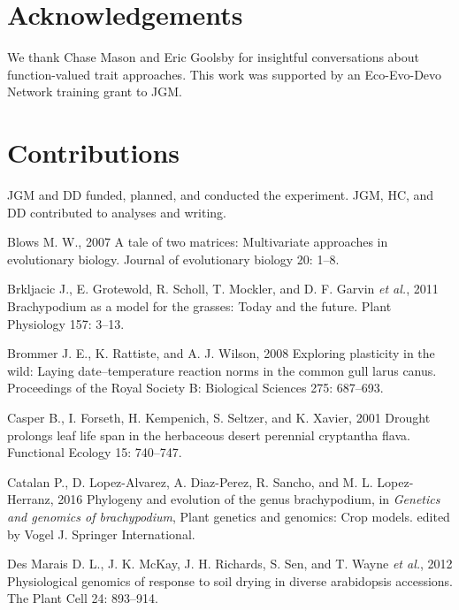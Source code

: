 \documentclass[jou,floatsintext]{apa6}
\begin{document}
\hypertarget{acknowledgements}{%
\section{Acknowledgements}\label{acknowledgements}}

We thank Chase Mason and Eric Goolsby for insightful conversations about function-valued trait approaches. This work was supported by an Eco-Evo-Devo Network training grant to JGM.

\hypertarget{contributions}{%
\section{Contributions}\label{contributions}}

JGM and DD funded, planned, and conducted the experiment. JGM, HC, and DD contributed to analyses and writing.

\newpage

\begingroup
\setlength{\parindent}{-0.5in}
\setlength{\leftskip}{0.5in}

\hypertarget{refs}{}
\leavevmode\hypertarget{ref-blows2007tale}{}%
Blows M. W., 2007 A tale of two matrices: Multivariate approaches in evolutionary biology. Journal of evolutionary biology 20: 1--8.

\leavevmode\hypertarget{ref-brkljacic2011brachypodium}{}%
Brkljacic J., E. Grotewold, R. Scholl, T. Mockler, and D. F. Garvin \emph{et al.}, 2011 Brachypodium as a model for the grasses: Today and the future. Plant Physiology 157: 3--13.

\leavevmode\hypertarget{ref-brommer2008exploring}{}%
Brommer J. E., K. Rattiste, and A. J. Wilson, 2008 Exploring plasticity in the wild: Laying date--temperature reaction norms in the common gull larus canus. Proceedings of the Royal Society B: Biological Sciences 275: 687--693.

\leavevmode\hypertarget{ref-casper2001drought}{}%
Casper B., I. Forseth, H. Kempenich, S. Seltzer, and K. Xavier, 2001 Drought prolongs leaf life span in the herbaceous desert perennial cryptantha flava. Functional Ecology 15: 740--747.

\leavevmode\hypertarget{ref-catalan2016phylogeny}{}%
Catalan P., D. Lopez-Alvarez, A. Diaz-Perez, R. Sancho, and M. L. Lopez-Herranz, 2016 Phylogeny and evolution of the genus brachypodium, in \emph{Genetics and genomics of brachypodium}, Plant genetics and genomics: Crop models. edited by Vogel J. Springer International.

\leavevmode\hypertarget{ref-des2012physiological}{}%
Des Marais D. L., J. K. McKay, J. H. Richards, S. Sen, and T. Wayne \emph{et al.}, 2012 Physiological genomics of response to soil drying in diverse arabidopsis accessions. The Plant Cell 24: 893--914.
\end{document}
